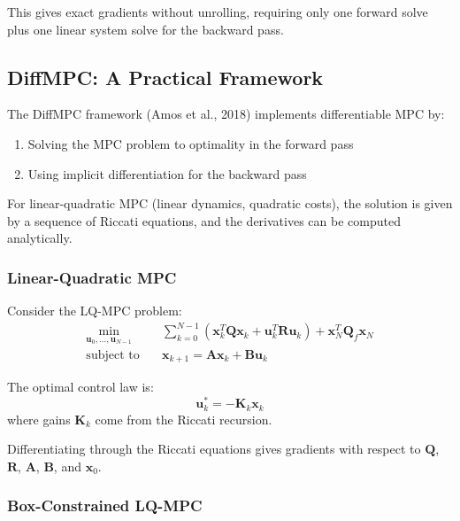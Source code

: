 This gives exact gradients without unrolling, requiring only one forward solve plus one linear system solve for the backward pass.

\subsection{DiffMPC: A Practical Framework}

The DiffMPC framework (Amos et al., 2018) implements differentiable MPC by:
\begin{enumerate}
    \item Solving the MPC problem to optimality in the forward pass
    \item Using implicit differentiation for the backward pass
\end{enumerate}

For linear-quadratic MPC (linear dynamics, quadratic costs), the solution is given by a sequence of Riccati equations, and the derivatives can be computed analytically.

\subsubsection{Linear-Quadratic MPC}

Consider the LQ-MPC problem:
\begin{equation}
\begin{aligned}
\min_{\mathbf{u}_0, \ldots, \mathbf{u}_{N-1}} \quad & \sum_{k=0}^{N-1} \left( \mathbf{x}_k^T \mathbf{Q} \mathbf{x}_k + \mathbf{u}_k^T \mathbf{R} \mathbf{u}_k \right) + \mathbf{x}_N^T \mathbf{Q}_f \mathbf{x}_N \\
\text{subject to} \quad & \mathbf{x}_{k+1} = \mathbf{A} \mathbf{x}_k + \mathbf{B} \mathbf{u}_k
\end{aligned}
\end{equation}

The optimal control law is:
\begin{equation}
\mathbf{u}_k^* = -\mathbf{K}_k \mathbf{x}_k
\end{equation}
where gains $\mathbf{K}_k$ come from the Riccati recursion.

Differentiating through the Riccati equations gives gradients with respect to $\mathbf{Q}$, $\mathbf{R}$, $\mathbf{A}$, $\mathbf{B}$, and $\mathbf{x}_0$.

\subsubsection{Box-Constrained LQ-MPC}

